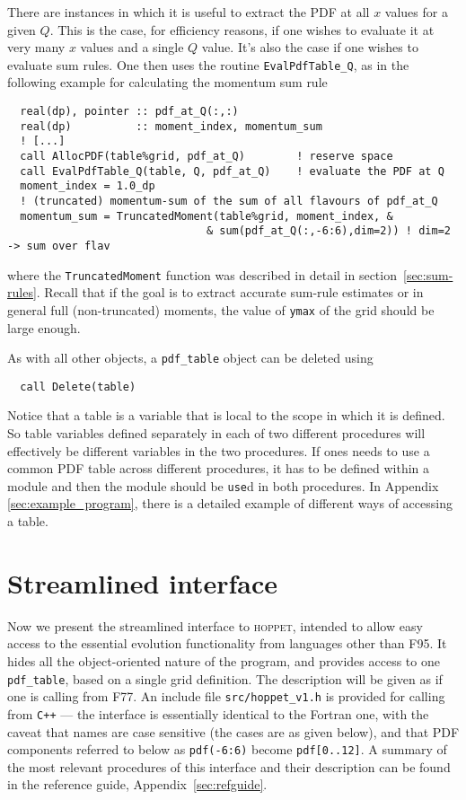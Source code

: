 \documentclass[12pt]{article}
\newcommand{\hoppet}{\textsc{hoppet}\xspace}
\newcommand{\ttt}[1]{\texttt{#1}}
\begin{document}
There are instances in which it is useful to extract the PDF at all
$x$ values for a given $Q$. This is the case, for efficiency reasons,
if one wishes to evaluate it at very many $x$ values and a single $Q$
value. It's also the case if one wishes to evaluate
sum rules. One then uses the routine \ttt{EvalPdfTable\_Q}, as in
the following example for calculating the momentum sum rule
\begin{lstlisting}
  real(dp), pointer :: pdf_at_Q(:,:)
  real(dp)          :: moment_index, momentum_sum
  ! [...]
  call AllocPDF(table%grid, pdf_at_Q)        ! reserve space
  call EvalPdfTable_Q(table, Q, pdf_at_Q)    ! evaluate the PDF at Q
  moment_index = 1.0_dp
  ! (truncated) momentum-sum of the sum of all flavours of pdf_at_Q
  momentum_sum = TruncatedMoment(table%grid, moment_index, &
                               & sum(pdf_at_Q(:,-6:6),dim=2)) ! dim=2 -> sum over flav
\end{lstlisting}
where the \ttt{TruncatedMoment} function was described in detail in
section~\ref{sec:sum-rules}. Recall that
if the goal is to extract accurate sum-rule estimates or in general
full (non-truncated) moments, the value of {\tt ymax} of the
grid should be large enough.

As with all other objects, a \ttt{pdf\_table} object can be deleted
using
\begin{lstlisting}
  call Delete(table) 
\end{lstlisting}
Notice that a table is a variable that is local to the scope in which
it is defined. So table variables defined separately in each of two
different procedures will effectively be different variables in the
two procedures.
%
If ones needs to use a common PDF table across different procedures,
it has to be defined within a module and then the module should
be \ttt{use}d in both procedures.  In Appendix \ref{sec:example_program},
there is a detailed example of different ways of accessing a table.






\section{Streamlined interface}
\label{sec:vanilla}

Now we present the streamlined interface to \hoppet,
intended to allow easy access
to the essential evolution functionality from languages other than
F95.  It hides all the object-oriented nature of the program, and
provides access to one \ttt{pdf\_table}, based on a single grid
definition. The description will be given as if one is calling from
F77. An include file \ttt{src/hoppet\_v1.h} is provided for calling
from {\tt C++} --- the interface is essentially identical to the Fortran
one, with the caveat that names are case sensitive (the cases are as
given below), and that PDF components referred to below as
\ttt{pdf(-6:6)} become \ttt{pdf[0..12]}. A summary of the
most relevant procedures of this interface 
and their description can be found 
in the reference guide, Appendix~\ref{sec:refguide}.
\end{document}

